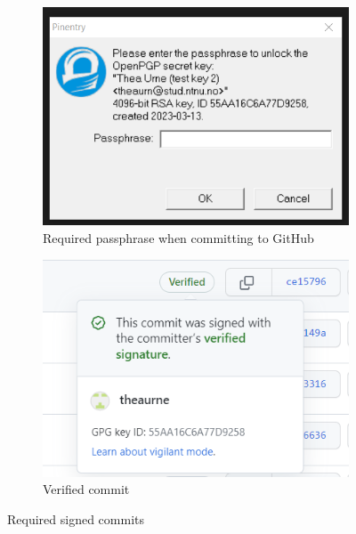 \begin{figure}[H]
  \centering
  \begin{subfigure}[H]{0.4\textwidth}
    \includegraphics[width=\textwidth]{Images/signedcommits.png}
    \caption{Required passphrase when committing to GitHub}
    \label{fig:image1}
  \end{subfigure}
  \hfill
  \begin{subfigure}[H]{0.4\textwidth}
    \includegraphics[width=\textwidth]{Images/verified-commit.png}
    \caption{Verified commit}
    \label{fig:image2}
  \end{subfigure}
  \caption{Required signed commits}
  \label{fig:overall}
\end{figure}

